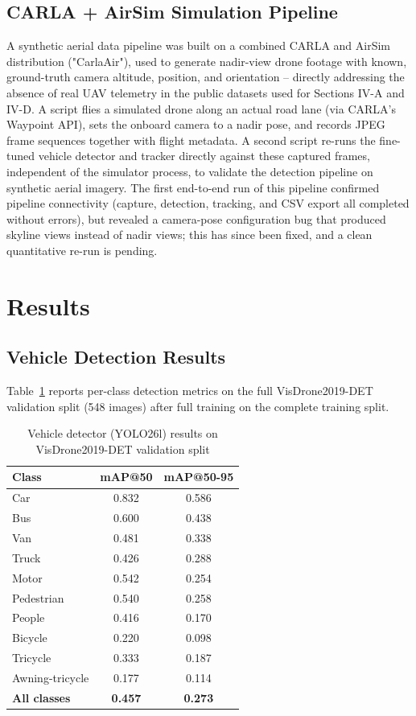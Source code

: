 \documentclass[conference]{IEEEtran}
\begin{document}
\subsection{CARLA + AirSim Simulation Pipeline}

A synthetic aerial data pipeline was built on a combined CARLA and AirSim distribution ("CarlaAir"), used to generate nadir-view drone footage with known, ground-truth camera altitude, position, and orientation -- directly addressing the absence of real UAV telemetry in the public datasets used for Sections IV-A and IV-D. A script flies a simulated drone along an actual road lane (via CARLA's Waypoint API), sets the onboard camera to a nadir pose, and records JPEG frame sequences together with flight metadata. A second script re-runs the fine-tuned vehicle detector and tracker directly against these captured frames, independent of the simulator process, to validate the detection pipeline on synthetic aerial imagery. The first end-to-end run of this pipeline confirmed pipeline connectivity (capture, detection, tracking, and CSV export all completed without errors), but revealed a camera-pose configuration bug that produced skyline views instead of nadir views; this has since been fixed, and a clean quantitative re-run is pending.

\section{Results}

\subsection{Vehicle Detection Results}

Table~\ref{tab:vehicle} reports per-class detection metrics on the full VisDrone2019-DET validation split (548 images) after full training on the complete training split.

\begin{table}[htbp]
\caption{Vehicle detector (YOLO26l) results on VisDrone2019-DET validation split}
\label{tab:vehicle}
\centering
\begin{tabular}{@{}lcc@{}}
\toprule
\textbf{Class} & \textbf{mAP@50} & \textbf{mAP@50-95} \\
\midrule
Car & 0.832 & 0.586 \\
Bus & 0.600 & 0.438 \\
Van & 0.481 & 0.338 \\
Truck & 0.426 & 0.288 \\
Motor & 0.542 & 0.254 \\
Pedestrian & 0.540 & 0.258 \\
People & 0.416 & 0.170 \\
Bicycle & 0.220 & 0.098 \\
Tricycle & 0.333 & 0.187 \\
Awning-tricycle & 0.177 & 0.114 \\
\midrule
\textbf{All classes} & \textbf{0.457} & \textbf{0.273} \\
\bottomrule
\end{tabular}
\end{table}
\end{document}
